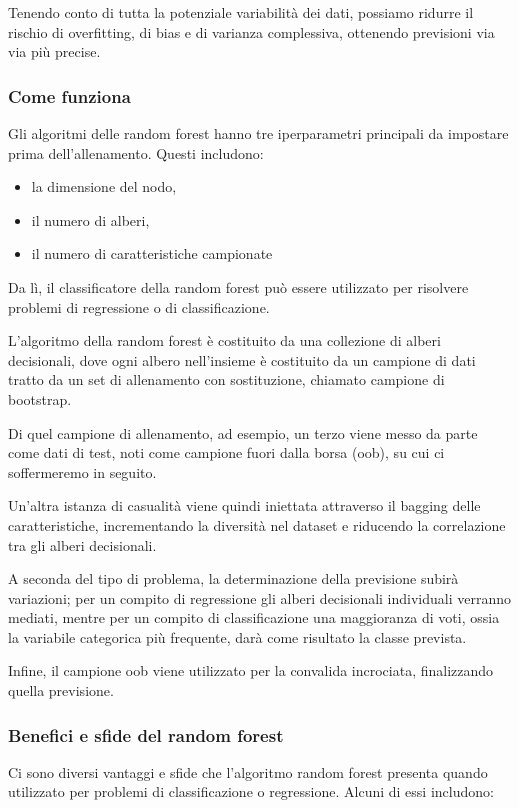 Tenendo conto di tutta la potenziale variabilità dei dati, possiamo ridurre il rischio di overfitting, di bias e di varianza complessiva, ottenendo previsioni via via più precise.

\subsubsection{Come funziona}
Gli algoritmi delle random forest hanno tre iperparametri principali da impostare prima dell'allenamento. 
Questi includono: 

\begin{itemize}
  \item la dimensione del nodo, 
  \item il numero di alberi, 
  \item il numero di caratteristiche campionate
\end{itemize}

Da lì, il classificatore della random forest può essere utilizzato per risolvere problemi di regressione o di classificazione.

L'algoritmo della random forest è costituito da una collezione di alberi decisionali, dove ogni albero nell'insieme è costituito da un campione di dati tratto da un set di allenamento con sostituzione, chiamato campione di bootstrap. 

Di quel campione di allenamento, ad esempio, un terzo viene messo da parte come dati di test, noti come campione fuori dalla borsa (oob), su cui ci soffermeremo in seguito. 

Un'altra istanza di casualità viene quindi iniettata attraverso il bagging delle caratteristiche, incrementando la diversità nel dataset e riducendo la correlazione tra gli alberi decisionali. 

A seconda del tipo di problema, la determinazione della previsione subirà variazioni; per un compito di regressione gli alberi decisionali individuali verranno mediati, mentre per un compito di classificazione una maggioranza di voti, ossia la variabile categorica più frequente, darà come risultato la classe prevista. 

Infine, il campione oob viene utilizzato per la convalida incrociata, finalizzando quella previsione.

\subsubsection{Benefici e sfide del random forest}
Ci sono diversi vantaggi e sfide che l'algoritmo random forest presenta quando utilizzato per problemi di classificazione o regressione. Alcuni di essi includono:

